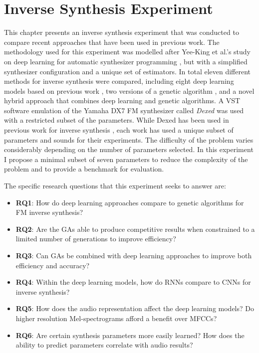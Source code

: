 \chapter{Inverse Synthesis Experiment}
\label{chapter:inverse_synth_experiment}

This chapter presents an inverse synthesis experiment that was conducted to compare recent approaches that have been used in previous work. The methodology used for this experiment was modelled after Yee-King et al.'s study on deep learning for automatic synthesizer programming \cite{yee2018automatic}, but with a simplified synthesizer configuration and a unique set of estimators. In total eleven different methods for inverse synthesis were compared, including eight deep learning models based on previous work \cite{barkan2019inversynth, yee2018automatic}, two versions of a genetic algorithm \cite{horner1993machine, tatar2016automatic}, and a novel hybrid approach that combines deep learning and genetic algorithms. A VST software emulation of the Yamaha DX7 FM synthesizer called \textit{Dexed} was used with a restricted subset of the parameters. While Dexed has been used in previous work for inverse synthesis \cite{yee2018automatic, luke2019stochastic, le2021improving, masudo2021quality}, each work has used a unique subset of parameters and sounds for their experiments. The difficulty of the problem varies considerably depending on the number of parameters selected. In this experiment I propose a minimal subset of seven parameters to reduce the complexity of the problem and to provide a benchmark for evaluation.

The specific research questions that this experiment seeks to answer are:
\begin{itemize}
    \item \textbf{RQ1}: How do deep learning approaches compare to genetic algorithms for FM inverse synthesis?
    \item \textbf{RQ2}: Are the GAs able to produce competitive results when constrained to a limited number of generations to improve efficiency?
    \item \textbf{RQ3}: Can GAs be combined with deep learning approaches to improve both efficiency and accuracy?
    \item \textbf{RQ4}: Within the deep learning models, how do RNNs compare to CNNs for inverse synthesis? 
    \item \textbf{RQ5}: How does the audio representation affect the deep learning models? Do higher resolution Mel-spectrograms afford a benefit over MFCCs?
    \item \textbf{RQ6}: Are certain synthesis parameters more easily learned? How does the ability to predict parameters correlate with audio results?
\end{itemize}

